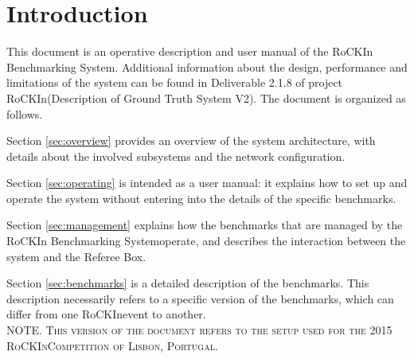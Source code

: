 \documentclass[a4paper]{article}
\newcommand{\ro}{RoCKIn}
\newcommand{\rbs}{RoCKIn Benchmarking System}
\begin{document}
\maketitle

\clearpage

\tableofcontents

\cleardoublepage


\section{Introduction}

This document is an operative description and user manual of the \rbs. Additional information about the design, performance and limitations of the system can be found in Deliverable 2.1.8 of project \ro (Description of Ground Truth System V2). The document is organized as follows.

Section 	\ref{sec:overview} provides an overview of the system architecture, with details about the involved subsystems and the network configuration.

Section \ref{sec:operating} is intended as a user manual: it explains how to set up and operate the system without entering into the details of the specific benchmarks.

Section \ref{sec:management} explains how the benchmarks that are managed by the \rbs operate, and describes the interaction between the system and the Referee Box.

Section \ref{sec:benchmarks} is a detailed description of the benchmarks. This description necessarily refers to a specific version of the benchmarks, which can differ from one \ro event to another.\\

\textsc{NOTE. This version of the document refers to the setup used for the 2015 \ro Competition of Lisbon, Portugal.}
\end{document}
